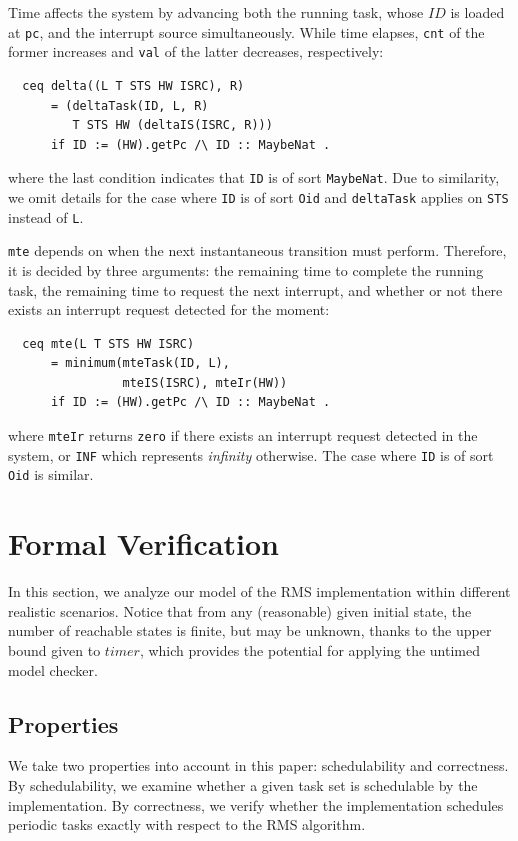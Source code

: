 \documentclass[journal]{IEEEtranTIE}
\begin{document}
Time affects the system by advancing both the running task, whose
$\mathit{ID}$ is loaded at \verb|pc|, and the interrupt source
simultaneously.  While time elapses, \verb|cnt| of the former
increases and \verb|val| of the latter decreases, respectively:
\begin{verbatim}
  ceq delta((L T STS HW ISRC), R)
      = (deltaTask(ID, L, R) 
         T STS HW (deltaIS(ISRC, R)))
      if ID := (HW).getPc /\ ID :: MaybeNat .
\end{verbatim}
where the last condition indicates that \verb|ID| is of sort
\verb|MaybeNat|. Due to similarity, we omit details for the case where
\verb|ID| is of sort \verb|Oid| and \verb|deltaTask| applies on
\verb|STS| instead of \verb|L|.

\verb|mte| depends on when the next instantaneous transition must
perform. Therefore, it is decided by three arguments: the remaining
time to complete the running task, the remaining time to request the
next interrupt, and whether or not there exists an interrupt request
detected for the moment:
\begin{verbatim}
  ceq mte(L T STS HW ISRC)
      = minimum(mteTask(ID, L),
                mteIS(ISRC), mteIr(HW))
      if ID := (HW).getPc /\ ID :: MaybeNat .
\end{verbatim}
where \verb|mteIr| returns \verb|zero| if there exists an interrupt
request detected in the system, or \verb|INF| which represents
\emph{infinity} otherwise. The case where \verb|ID| is of sort
\verb|Oid| is similar.


\section{Formal Verification}
\label{s:verification}
In this section, we analyze our model of the RMS implementation within
different realistic scenarios.  Notice that from any (reasonable)
given initial state, the number of reachable states is finite, but may
be unknown, thanks to the upper bound given to $\mathit{timer}$, which
provides the potential for applying the untimed model checker.

\subsection{Properties}
We take two properties into account in this paper: schedulability and
correctness. By schedulability, we examine whether a given task set is
schedulable by the implementation. By correctness, we verify whether
the implementation schedules periodic tasks exactly with respect to
the RMS algorithm.
\end{document}
